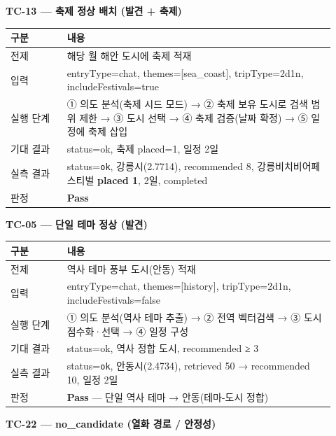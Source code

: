 \documentclass[11pt,a4paper]{article}
\begin{document}
\textbf{TC-13 --- 축제 정상 배치 (발견 + 축제)}

\begin{small}
\begin{longtable}{@{}>{\RaggedRight\arraybackslash}m{0.160\linewidth}>{\RaggedRight\arraybackslash}m{0.760\linewidth}@{}}
\toprule\noalign{}
구분 & 내용 \\
\midrule\noalign{}
\endhead
\bottomrule\noalign{}
\endlastfoot
전제 & 해당 월 해안 도시에 축제 적재 \\
입력 & entryType=chat, themes={[}sea\_coast{]}, tripType=2d1n, includeFestivals=true \\
실행 단계 & ① 의도 분석(축제 시드 모드) → ② 축제 보유 도시로 검색 범위 제한 → ③ 도시 선택 → ④ 축제 검증(날짜 확정) → ⑤ 일정에 축제 삽입 \\
기대 결과 & status=ok, 축제 placed=1, 일정 2일 \\
실측 결과 & status=\texttt{ok}, 강릉시(2.7714), recommended 8, 강릉비치비어페스티벌 \textbf{placed 1}, 2일, completed \\
판정 & \textbf{Pass} \\
\end{longtable}
\end{small}

\textbf{TC-05 --- 단일 테마 정상 (발견)}

\begin{small}
\begin{longtable}{@{}>{\RaggedRight\arraybackslash}m{0.160\linewidth}>{\RaggedRight\arraybackslash}m{0.760\linewidth}@{}}
\toprule\noalign{}
구분 & 내용 \\
\midrule\noalign{}
\endhead
\bottomrule\noalign{}
\endlastfoot
전제 & 역사 테마 풍부 도시(안동) 적재 \\
입력 & entryType=chat, themes={[}history{]}, tripType=2d1n, includeFestivals=false \\
실행 단계 & ① 의도 분석(역사 테마 추출) → ② 전역 벡터검색 → ③ 도시 점수화·선택 → ④ 일정 구성 \\
기대 결과 & status=ok, 역사 정합 도시, recommended ≥ 3 \\
실측 결과 & status=\texttt{ok}, 안동시(2.4734), retrieved 50 → recommended 10, 일정 2일 \\
판정 & \textbf{Pass} --- 단일 역사 테마 → 안동(테마-도시 정합) \\
\end{longtable}
\end{small}

\textbf{TC-22 --- no\_candidate (열화 경로 / 안정성)}
\end{document}
